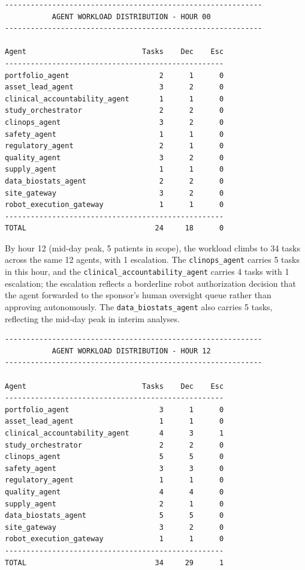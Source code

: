 \begin{verbatim}
------------------------------------------------------------
           AGENT WORKLOAD DISTRIBUTION - HOUR 00
------------------------------------------------------------

Agent                           Tasks    Dec    Esc
---------------------------------------------------
portfolio_agent                     2      1      0
asset_lead_agent                    3      2      0
clinical_accountability_agent       1      1      0
study_orchestrator                  2      2      0
clinops_agent                       3      2      0
safety_agent                        1      1      0
regulatory_agent                    2      1      0
quality_agent                       3      2      0
supply_agent                        1      1      0
data_biostats_agent                 2      2      0
site_gateway                        3      2      0
robot_execution_gateway             1      1      0
---------------------------------------------------
TOTAL                              24     18      0
\end{verbatim}

By hour 12 (mid-day peak, 5 patients in scope), the workload climbs
to 34 tasks across the same 12 agents, with 1 escalation. The
\texttt{clinops\_agent} carries 5 tasks in this hour, and the
\texttt{clinical\_accountability\_agent} carries 4 tasks with 1
escalation; the escalation reflects a borderline robot authorization
decision that the agent forwarded to the sponsor's human oversight
queue rather than approving autonomously. The
\texttt{data\_biostats\_agent} also carries 5 tasks, reflecting the
mid-day peak in interim analyses.  

\begin{verbatim}
------------------------------------------------------------
           AGENT WORKLOAD DISTRIBUTION - HOUR 12
------------------------------------------------------------

Agent                           Tasks    Dec    Esc
---------------------------------------------------
portfolio_agent                     3      1      0
asset_lead_agent                    1      1      0
clinical_accountability_agent       4      3      1
study_orchestrator                  2      2      0
clinops_agent                       5      5      0
safety_agent                        3      3      0
regulatory_agent                    1      1      0
quality_agent                       4      4      0
supply_agent                        2      1      0
data_biostats_agent                 5      5      0
site_gateway                        3      2      0
robot_execution_gateway             1      1      0
---------------------------------------------------
TOTAL                              34     29      1
\end{verbatim}

